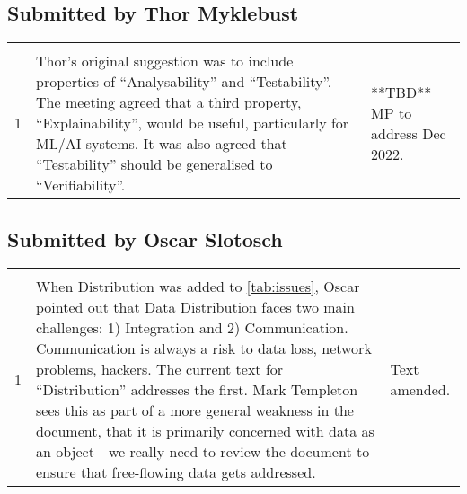 \subsection{Submitted by Thor Myklebust}
\begin{longtable}[H]
{|L{}|L{}|L{}|}
\hline
{} &  & \\
\hline
  \endfirsthead
  \hline{} &  & \\\hline
  \endhead
  \endfoot
  \endlastfoot

  1 &
  Thor's original suggestion was to include properties of ``Analysability'' and ``Testability''.
  The meeting agreed that a third property, ``Explainability'', would be useful, particularly
  for ML/AI systems.
  It was also agreed that ``Testability'' should be generalised to ``Verifiability''. &
  **TBD** MP to address Dec 2022.\\\hline
\end{longtable}

\subsection{Submitted by Oscar Slotosch}
\begin{longtable}[H]
{|L{}|L{}|L{}|}
\hline
{} &  & \\
\hline
  \endfirsthead
  \hline{} &  & \\\hline
  \endhead
  \endfoot
  \endlastfoot
  1 &
  When Distribution was added to \autoref{tab:issues}, Oscar pointed out that
  Data Distribution faces two main challenges: 1) Integration and 2) Communication.
  Communication is always a risk to data loss, network problems, hackers.
  The current text for ``Distribution'' addresses the first.
  Mark Templeton sees this as part of a more general weakness in the document,
  that it is primarily concerned with data as an object -
  we really need to review the document to ensure that free-flowing data gets addressed.
   &
  Text amended.\\\hline
\end{longtable}


